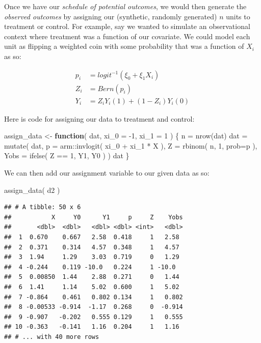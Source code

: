 \documentclass[
]{book}
\newenvironment{Shaded}{\begin{snugshade}}{\end{snugshade}}
\newcommand{\AttributeTok}[1]{\textcolor[rgb]{0.77,0.63,0.00}{#1}}
\newcommand{\ControlFlowTok}[1]{\textcolor[rgb]{0.13,0.29,0.53}{\textbf{#1}}}
\newcommand{\DecValTok}[1]{\textcolor[rgb]{0.00,0.00,0.81}{#1}}
\newcommand{\FunctionTok}[1]{\textcolor[rgb]{0.00,0.00,0.00}{#1}}
\newcommand{\NormalTok}[1]{#1}
\newcommand{\OtherTok}[1]{\textcolor[rgb]{0.56,0.35,0.01}{#1}}
\newcommand{\SpecialCharTok}[1]{\textcolor[rgb]{0.00,0.00,0.00}{#1}}
\begin{document}
Once we have our \emph{schedule of potential outcomes}, we would then generate the \emph{observed outcomes} by assigning our (synthetic, randomly generated) \(n\) units to treatment or control.
For example, say we wanted to simulate an observational context where treatment was a function of our covariate.
We could model each unit as flipping a weighted coin with some probability that was a function of \(X_i\) as so:

\[
\begin{aligned}
p_i &= logit^{-1}( \xi_0 + \xi_1 X_i ) \\
Z_i &= Bern( p_i ) \\
Y_i &= Z_i Y_i(1) + (1-Z_i) Y_i(0) 
\end{aligned}
\]

Here is code for assigning our data to treatment and control:

\begin{Shaded}
\begin{Highlighting}[]
\NormalTok{assign\_data }\OtherTok{\textless{}{-}} \ControlFlowTok{function}\NormalTok{( dat,}
                         \AttributeTok{xi\_0 =} \SpecialCharTok{{-}}\DecValTok{1}\NormalTok{, }\AttributeTok{xi\_1 =} \DecValTok{1}\NormalTok{ ) \{}
\NormalTok{  n }\OtherTok{=} \FunctionTok{nrow}\NormalTok{(dat)}
\NormalTok{  dat }\OtherTok{=} \FunctionTok{mutate}\NormalTok{( dat,}
                \AttributeTok{p =}\NormalTok{ arm}\SpecialCharTok{::}\FunctionTok{invlogit}\NormalTok{( xi\_0 }\SpecialCharTok{+}\NormalTok{ xi\_1 }\SpecialCharTok{*}\NormalTok{ X ),}
                \AttributeTok{Z =} \FunctionTok{rbinom}\NormalTok{( n, }\DecValTok{1}\NormalTok{, }\AttributeTok{prob=}\NormalTok{p ),}
                \AttributeTok{Yobs =} \FunctionTok{ifelse}\NormalTok{( Z }\SpecialCharTok{==} \DecValTok{1}\NormalTok{, Y1, Y0 ) )}
\NormalTok{  dat}
\NormalTok{\}}
\end{Highlighting}
\end{Shaded}

We can then add our assignment variable to our given data as so:

\begin{Shaded}
\begin{Highlighting}[]
\FunctionTok{assign\_data}\NormalTok{( d2 )}
\end{Highlighting}
\end{Shaded}

\begin{verbatim}
## # A tibble: 50 x 6
##           X     Y0      Y1     p     Z    Yobs
##       <dbl>  <dbl>   <dbl> <dbl> <int>   <dbl>
##  1  0.670    0.667   2.58  0.418     1   2.58 
##  2  0.371    0.314   4.57  0.348     1   4.57 
##  3  1.94     1.29    3.03  0.719     0   1.29 
##  4 -0.244    0.119 -10.0   0.224     1 -10.0  
##  5  0.00850  1.44    2.88  0.271     0   1.44 
##  6  1.41     1.14    5.02  0.600     1   5.02 
##  7 -0.864    0.461   0.802 0.134     1   0.802
##  8 -0.00533 -0.914  -1.17  0.268     0  -0.914
##  9 -0.907   -0.202   0.555 0.129     1   0.555
## 10 -0.363   -0.141   1.16  0.204     1   1.16 
## # ... with 40 more rows
\end{verbatim}
\end{document}
